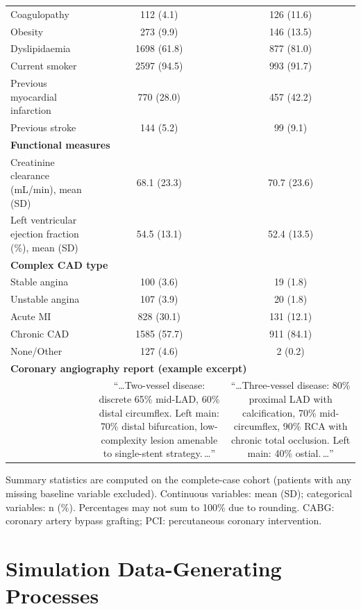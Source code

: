 \documentclass{article}
\begin{document}
\begin{table}[htbp]
{\begin{tabular}{lcc}
\quad Coagulopathy & 112 (4.1) & 126 (11.6) \\
\quad Obesity & 273 (9.9) & 146 (13.5) \\
\quad Dyslipidaemia & 1698 (61.8) & 877 (81.0) \\
\quad Current smoker & 2597 (94.5) & 993 (91.7) \\
\quad Previous myocardial infarction & 770 (28.0) & 457 (42.2) \\
\quad Previous stroke & 144 (5.2) & 99 (9.1) \\
\hline
\multicolumn{3}{l}{\textbf{Functional measures}} \\
Creatinine clearance (mL/min), mean (SD) & 68.1 (23.3) & 70.7 (23.6) \\
Left ventricular ejection fraction (\%), mean (SD) & 54.5 (13.1) & 52.4 (13.5) \\
\hline
\multicolumn{3}{l}{\textbf{Complex CAD type}} \\
Stable angina & 100 (3.6) & 19 (1.8) \\
Unstable angina & 107 (3.9) & 20 (1.8) \\
Acute MI & 828 (30.1) & 131 (12.1) \\
Chronic CAD & 1585 (57.7) & 911 (84.1) \\
None/Other & 127 (4.6) & 2 (0.2) \\
\hline
\multicolumn{3}{l}{\textbf{Coronary angiography report (example excerpt)}} \\
 & \multicolumn{1}{p{6cm}}{\footnotesize ``\ldots Two-vessel disease: discrete 65\% mid-LAD, 60\% distal circumflex. Left main: 70\% distal bifurcation, low-complexity lesion amenable to single-stent strategy.\,\ldots''} & \multicolumn{1}{p{6cm}}{\footnotesize ``\ldots Three-vessel disease: 80\% proximal LAD with calcification, 70\% mid-circumflex, 90\% RCA with chronic total occlusion. Left main: 40\% ostial.\,\ldots''} \\
\hline
\end{tabular}%
}
\vspace{0.5em}
\parbox{\textwidth}{\footnotesize Summary statistics are computed on the complete-case cohort (patients with any missing baseline variable excluded). Continuous variables: mean (SD); categorical variables: n (\%). Percentages may not sum to 100\% due to rounding. CABG: coronary artery bypass grafting; PCI: percutaneous coronary intervention.}
\end{table}

\section{Simulation Data-Generating Processes}\label{appendix:dgps}
\end{document}
